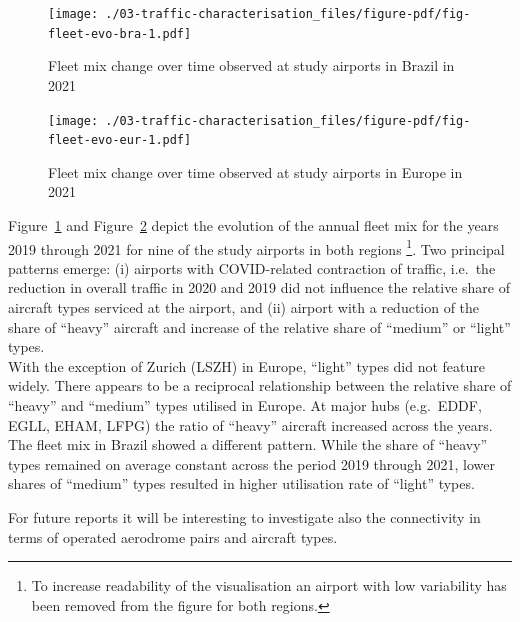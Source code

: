 \documentclass[
  a4paper,
  DIV=11,
  numbers=noendperiod]{scrreprt}
\begin{document}
\begin{figure}[h]

{\centering \texttt{[image: ./03-traffic-characterisation\_files/figure-pdf/fig-fleet-evo-bra-1.pdf]}

}

\caption{\label{fig-fleet-evo-bra}Fleet mix change over time observed at
study airports in Brazil in 2021}

\end{figure}

\begin{figure}[h]

{\centering \texttt{[image: ./03-traffic-characterisation\_files/figure-pdf/fig-fleet-evo-eur-1.pdf]}

}

\caption{\label{fig-fleet-evo-eur}Fleet mix change over time observed at
study airports in Europe in 2021}

\end{figure}

Figure~\ref{fig-fleet-evo-bra} and Figure~\ref{fig-fleet-evo-eur} depict
the evolution of the annual fleet mix for the years 2019 through 2021
for nine of the study airports in both regions \footnote{To increase
  readability of the visualisation an airport with low variability has
  been removed from the figure for both regions.}. Two principal
patterns emerge: (i) airports with COVID-related contraction of traffic,
i.e.~the reduction in overall traffic in 2020 and 2019 did not influence
the relative share of aircraft types serviced at the airport, and (ii)
airport with a reduction of the share of ``heavy'' aircraft and increase
of the relative share of ``medium'' or ``light'' types.\\
With the exception of Zurich (LSZH) in Europe, ``light'' types did not
feature widely. There appears to be a reciprocal relationship between
the relative share of ``heavy'' and ``medium'' types utilised in Europe.
At major hubs (e.g.~EDDF, EGLL, EHAM, LFPG) the ratio of ``heavy''
aircraft increased across the years.\\
The fleet mix in Brazil showed a different pattern. While the share of
``heavy'' types remained on average constant across the period 2019
through 2021, lower shares of ``medium'' types resulted in higher
utilisation rate of ``light'' types.

For future reports it will be interesting to investigate also the
connectivity in terms of operated aerodrome pairs and aircraft types.
\end{document}
